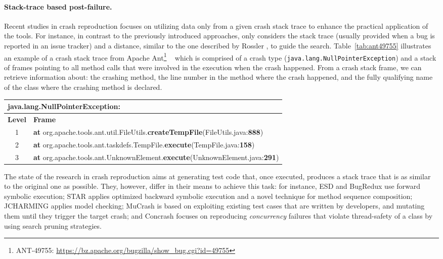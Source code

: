 \paragraph{Stack-trace based post-failure.}

Recent studies in crash reproduction \cite{BPT17concrash, soltani2017, Nayrolles2017, Xuan2015, Chen2015} focuses on utilizing data only from a given crash stack trace to enhance the practical application of the tools. For instance,  in contrast to the previously introduced approaches, \evocrash only considers the stack trace (usually provided when a bug is reported in an issue tracker) and a distance, similar to the one described by Rossler \etal \cite{Rossler2013}, to guide the search.
%
Table~\ref{tab:ant49755} illustrates an example of a crash stack trace from Apache Ant\footnote{ANT-49755: \url{https://bz.apache.org/bugzilla/show_bug.cgi?id=49755} } ~\cite{ant} which is comprised of a crash type (\texttt{java.lang.Null\-Pointer\-Exception}) and a stack of frames pointing to all method calls that were involved in the execution when the crash happened.
From a crash stack frame, we can retrieve information about: the crashing method, the line number in the method where the crash happened, and the fully qualifying name of the class where the crashing method is declared.

\begin{table*}[t]
\centering
\caption{The crash stack trace for Apache Ant-49755.}
\label{tab:ant49755}
\begin{tabular}{c|l}
\multicolumn{2}{l}{java.lang.\textbf{NullPointerException}:}\\
\hline
\textbf{Level} & \textbf{Frame} \\
\hline
1 & \textbf{at} org.apache.tools.ant.util.FileUtils.\textbf{createTempFile}(FileUtils.java:\textbf{888})\\
2 & \textbf{at} org.apache.tools.ant.taskdefs.TempFile.\textbf{execute}(TempFile.java:\textbf{158})\\
3 & \textbf{at} org.apache.tools.ant.UnknownElement.\textbf{execute}(UnknownElement.java:\textbf{291}) \\
\end{tabular}
\end{table*}

The state of the research in crash reproduction \cite{Zamfir2010, jin2012bugredux, BPT17concrash, soltani2017, Nayrolles2017, Xuan2015, Chen2015} aims at generating test code that, once executed, produces a stack trace that is as similar to the original one as possible. They, however, differ in their means to achieve this task: for instance, 
\textrm{ESD} \cite{Zamfir2010} and \textrm{BugRedux} \cite{jin2012bugredux}  use forward symbolic execution; \textrm{STAR} \cite{Chen2015} applies optimized backward symbolic execution and a novel technique for method sequence composition; \textrm{JCHARMING} \cite{Nayrolles2017} applies model checking; \textrm{MuCrash} \cite{Xuan2015} is based on exploiting existing test cases that are written by developers, and mutating them until they trigger the target crash; and \textrm{Concrash} \cite{BPT17concrash} focuses on reproducing \textit{concurrency} failures that violate thread-safety of a class by using search pruning strategies.

